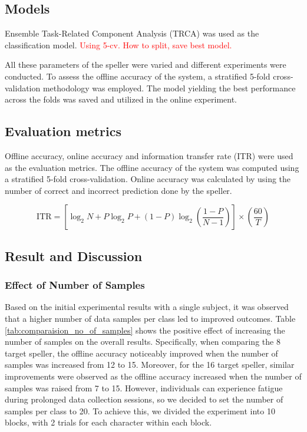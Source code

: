 \subsection{Models}
\label{metho:models}
Ensemble Task-Related Component Analysis (TRCA) was used as the classification model.
\textcolor{red}{Using 5-cv. How to split, save best model.}

All these parameters of the speller were varied and different experiments were conducted. To assess the offline accuracy of the system, a stratified 5-fold cross-validation methodology was employed. The model yielding the best performance across the folds was saved and utilized in the online experiment.

\subsection{Evaluation metrics}
Offline accuracy, online accuracy and information transfer rate (ITR) were used as the evaluation metrics. The offline accuracy of the system was computed using a stratified 5-fold cross-validation. Online accuracy was calculated by using the number of correct and incorrect prediction done by the speller.

\[
\text{{ITR}} = \left[\log_2 N + P \log_2 P + (1 - P) \log_2 \left(\frac{{1-P}}{{N-1}}\right)\right] \times \left(\frac{{60}}{{T}}\right)
\]

\subsection{Result and Discussion}

\subsubsection{Effect of Number of Samples}

Based on the initial experimental results with a single subject, it was observed that a higher number of data samples per class led to improved outcomes. 
Table \ref{tab:comparaision_no_of_samples} shows the positive effect of increasing the number of samples on the overall results. Specifically, when comparing the 8 target speller, the offline accuracy noticeably improved when the number of samples was increased from 12 to 15. Moreover, for the 16 target speller, similar improvements were observed as the offline accuracy increased when the number of samples was raised from 7 to 15. However, individuals can experience fatigue during prolonged data collection sessions, so we decided to set the number of samples per class to 20. To achieve this, we divided the experiment into 10 blocks, with 2 trials for each character within each block.

